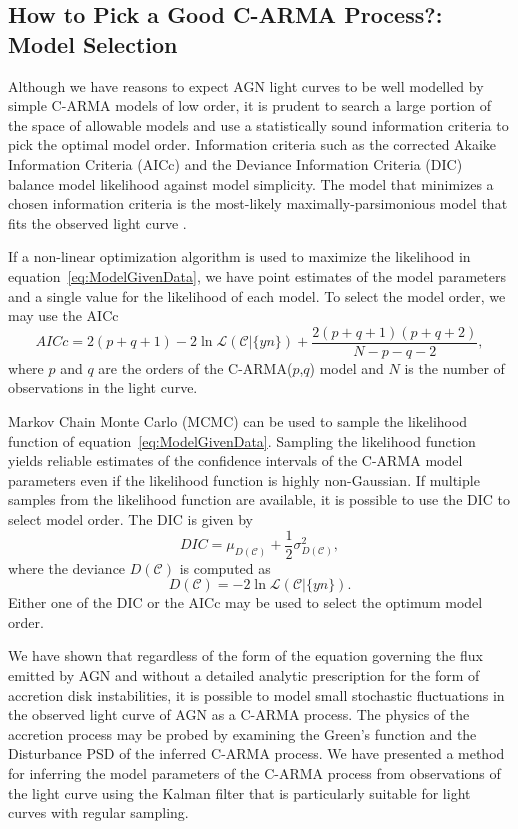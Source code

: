 \documentclass[a4paper,fleqn,usenatbib]{mnras}
\begin{document}
\subsection[Model Selection]{How to Pick a Good C-ARMA Process?: Model Selection}\label{sec:ModelSelection}

Although we have reasons to expect AGN light curves to be well modelled by simple C-ARMA models of low order, it is prudent to search a large portion of the space of allowable models and use a statistically sound information criteria to pick the optimal model order. Information criteria such as the corrected Akaike Information Criteria (AICc) and the Deviance Information Criteria (DIC) balance model likelihood against model simplicity. The model that minimizes a chosen information criteria is the most-likely maximally-parsimonious model that fits the observed light curve \citep{ModelSelection}. 

If a non-linear optimization algorithm is used to maximize the likelihood in equation~\eqref{eq:ModelGivenData}, we have point estimates of the model parameters and a single value for the likelihood of each model. To select the model order, we may use the AICc
\begin{equation}\label{eq:AICc}
AICc = 2(p+q+1) - 2 \ln \mathcal{L}(\mathcal{C}|\{y{n}\}) + \frac{2(p+q+1)(p+q+2)}{N-p-q-2},
\end{equation}
where $p$ and $q$ are the orders of the C-ARMA($p$,$q$) model and $N$ is the number of observations in the light curve.

Markov Chain Monte Carlo (MCMC) can be used to sample the likelihood function of equation~\eqref{eq:ModelGivenData}. Sampling the likelihood function yields reliable estimates of the confidence intervals of the C-ARMA model parameters even if the likelihood function is highly non-Gaussian. If multiple samples from the likelihood function are available, it is possible to use the DIC to select model order. The DIC is given by
\begin{equation}\label{eq:DIC}
DIC = \mu_{D(\mathcal{C})} + \frac{1}{2}\sigma^{2}_{D(\mathcal{C})},
\end{equation}
where the deviance $D(\mathcal{C})$ is computed as
\begin{equation}\label{eq:Deviance}
D(\mathcal{C}) = -2\ln \mathcal{L}(\mathcal{C}|\{y{n}\}).
\end{equation}
Either one of the DIC or the AICc may be used to select the optimum model order.

We have shown that regardless of the form of the equation governing the flux emitted by AGN and without a detailed analytic prescription for the form of accretion disk instabilities, it is possible to model small stochastic fluctuations in the observed light curve of AGN as a C-ARMA process. The physics of the accretion process may be probed by examining the Green's function and the Disturbance PSD of the inferred C-ARMA process. We have presented a method for inferring the model parameters of the C-ARMA process from observations of the light curve using the Kalman filter that is particularly suitable for light curves with regular sampling.
\end{document}
